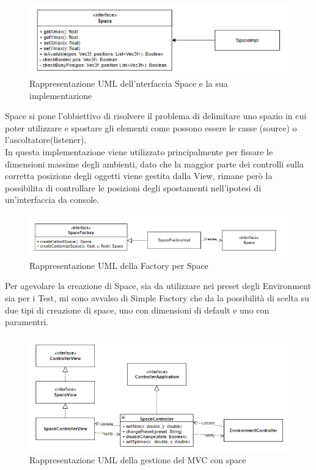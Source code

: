 \documentclass[a4paper,12pt]{report}
\begin{document}
\begin{figure}[H]
\centering{}
\includegraphics[width=\textwidth]{img/space/Space.png}
\caption{Rappresentazione UML dell'nterfaccia Space e la sua implementazione}
\label{img:space}
\end{figure}
Space si pone l'obbiettivo di risolvere il problema di delimitare uno spazio in cui poter utilizzare e spostare gli elementi come possono essere le casse (source) o l'ascoltatore(listener). \\In questa implementazione viene utilizzato principalmente per fissare le dimensioni massime degli ambienti, dato che la maggior parte dei controlli sulla corretta posizione degli oggetti viene gestita dalla View, rimane però la possibilita di controllare le posizioni degli spostamenti nell'ipotesi di un'interfaccia da console.
%
\begin{figure}[H]
\centering{}
\includegraphics[width=\textwidth]{img/space/SpaceFactory.png}
\caption{Rappresentazione UML della Factory per Space}
\label{img:spacefactory}
\end{figure}
Per agevolare la creazione di Space, sia da utilizzare nei preset degli Environment sia per i Test, mi sono avvalso di Simple Factory che da la possibilità di scelta su due tipi di creazione di space, uno con dimensioni di default e uno con paramentri.
%
\begin{figure}[H]
\centering{}
\includegraphics[width=\textwidth]{img/space/SpaceMVC.png}
\caption{Rappresentazione UML della gestione del MVC con space}
\label{img:spacemvc}
\end{figure}
\end{document}
